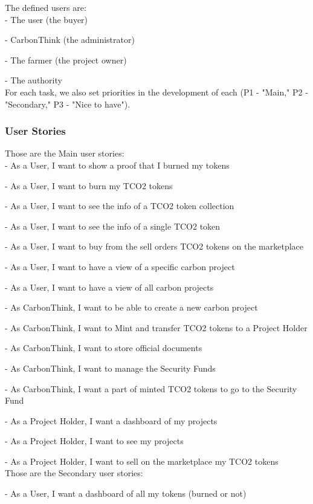 \documentclass[a4paper, 12pt]{article}
\begin{document}
The defined users are:\\

- The user (the buyer)

- CarbonThink (the administrator)

- The farmer (the project owner)

- The authority\\

For each task, we also set priorities in the development of each (P1 - "Main," P2 - "Secondary," P3 - "Nice to have").

\subsubsection{User Stories}

Those are the Main user stories:\\

- As a User, I want to show a proof that I burned my tokens

- As a User, I want to burn my TCO2 tokens

- As a User, I want to see the info of a TCO2 token collection

- As a User, I want to see the info of a single TCO2 token

- As a User, I want to buy from the sell orders TCO2 tokens on the marketplace

- As a User, I want to have a view of a specific carbon project

- As a User, I want to have a view of all carbon projects

- As CarbonThink, I want to be able to create a new carbon project

- As CarbonThink, I want to Mint and transfer TCO2 tokens to a Project Holder

- As CarbonThink, I want to store official documents

- As CarbonThink, I want to manage the Security Funds

- As CarbonThink, I want a part of minted TCO2 tokens to go to the Security Fund

- As a Project Holder, I want a dashboard of my projects

- As a Project Holder, I want to see my projects

- As a Project Holder, I want to sell on the marketplace my TCO2 tokens \\

Those are the Secondary user stories:

- As a User, I want a dashboard of all my tokens (burned or not)
\end{document}
